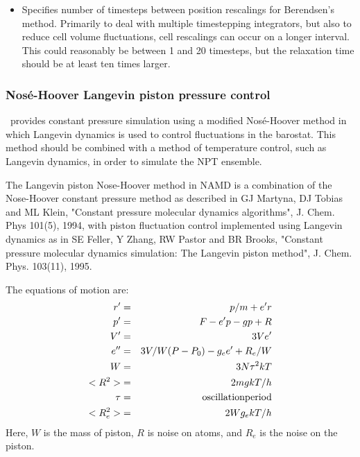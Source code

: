 \begin{itemize}
\item
{}
{Specifies number of timesteps between position rescalings for Berendsen's method.
Primarily to deal with multiple timestepping integrators, but also to reduce
cell volume fluctuations, cell rescalings can occur on a longer interval.
This could reasonably be between 1 and 20 timesteps, but the relaxation time
should be at least ten times larger.
}

\end{itemize}

\subsubsection{Nos\'{e}-Hoover Langevin piston pressure control}

\NAMD\ provides constant pressure simulation using a modified Nos\'{e}-Hoover method in which Langevin dynamics is used to control fluctuations in the barostat.
This method should be combined with a method of temperature control, such as Langevin dynamics, in order to simulate the NPT ensemble.

The Langevin piston Nose-Hoover method in NAMD is a combination of the
Nose-Hoover constant pressure method as described in 
GJ Martyna, DJ Tobias and ML Klein, "Constant pressure molecular dynamics
algorithms", J. Chem. Phys 101(5), 1994,
with piston fluctuation control implemented using Langevin dynamics as in
SE Feller, Y Zhang, RW Pastor and BR Brooks, "Constant pressure molecular
dynamics simulation: The Langevin piston method", J. Chem. Phys. 103(11),
1995.

The equations of motion are:
\begin{eqnarray*}
       r' &=& p/m + e' r  \\
       p' &=& F - e' p - g p + R \\
       V' &=& 3 V e' \\
       e'' &=& 3V/W (P - P_0) - g_e e' + R_e/W  \\
       W &=&  3 N \tau^2 k T  \\
       <R^2> &=& 2 m g k T / h \\
       \tau &=& {\rm oscillation period} \\
       <R_e^2> &=& 2 W g_e k T / h
\end{eqnarray*}
Here, $W$ is the mass of piston, $R$ is noise on atoms, and $R_e$ is
the noise on the piston.

